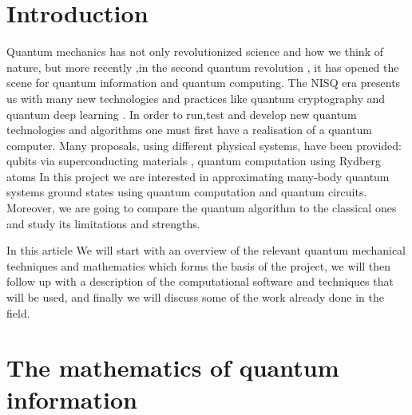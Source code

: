 \documentclass{physics_article}
\date{}
\begin{document}
	\maketitle
	\tableofcontents

	\section{Introduction \label{intro}}
	Quantum mechanics has not only revolutionized science and how we think of nature, but more recently ,in the second quantum revolution \cite{https://doi.org/10.48550/arxiv.quant-ph/0206091}, it has opened the scene for quantum information and quantum computing. The NISQ era \cite{Preskill2018quantumcomputingin} presents us with many new technologies and practices like quantum cryptography \cite{bernstein_buchmann_dahmen_2009} and quantum deep learning \cite{https://doi.org/10.48550/arxiv.1711.02038}. In order to run,test and develop new quantum technologies and algorithms one must first have a realisation of a quantum computer. Many proposals, using different physical systems, have been provided: qubits via superconducting materials \cite{PhysRevLett.85.2208, nakamura_pashkin_tsai_1999}, quantum computation using Rydberg atoms \cite{PhysRevLett.74.4091,PhysRevLett.75.4714}  In this project we are interested in approximating many-body quantum systems ground states using quantum computation and quantum circuits. Moreover, we are going to compare the quantum algorithm to the classical ones and study its limitations and strengths. 

	In this article We will start with an overview{} of the relevant quantum mechanical techniques and mathematics which forms the basis of the project, we will then follow up with a description of the computational software and techniques that will be used, and finally we will discuss some of the work already done in the field.

	\section{The mathematics of quantum information}
\end{document}
